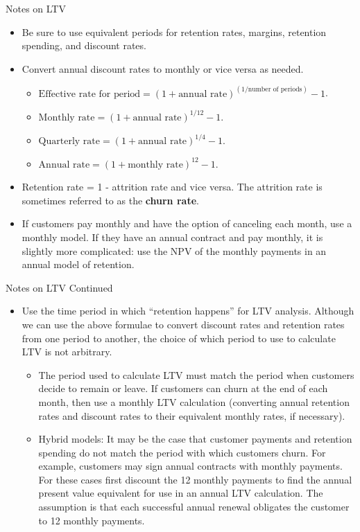 \documentclass[pdf]{beamer}
\newcommand{\empr}[1]{{\color{franklinblue}\textbf{#1}}}
\theoremstyle{remark}
\theoremstyle{definition}
\begin{document}
\begin{frame}[t]{Notes on LTV}
\small
\begin{itemize}
\item Be sure to use equivalent periods for retention rates, margins, retention spending, and discount rates.
\item Convert annual discount rates to monthly or vice versa as needed. 
\begin{itemize}
\item $\text{Effective rate for period} = (1 + \text{annual rate})^{(1 / \text{number of periods})} - 1$.
  \item $\text{Monthly rate} = (1 + \text{annual rate})^{1/12} - 1.$
  \item $\text{Quarterly rate} = (1 + \text{annual rate})^{1/4} - 1.$
  \item $\text{Annual rate} = (1 + \text{monthly rate})^{12} - 1.$
\end{itemize}
\item Retention rate = 1 - attrition rate and vice versa. The attrition rate is sometimes referred to as the \empr{churn rate}.
\item If customers pay monthly and have the option of canceling each month, use a monthly model. If they have an annual contract and pay monthly, it is slightly more complicated: use the NPV of the monthly payments in an annual model of retention.
\end{itemize}
\end{frame}

\begin{frame}[t]{Notes on LTV Continued}
\small
\begin{itemize}
\item Use the time period in which ``retention happens'' for LTV analysis. Although we can use the above formulae to convert discount rates and retention rates from one period to another, the choice of which period to use to calculate LTV is not arbitrary.
\begin{itemize}
  \item The period used to calculate LTV must match the period when customers decide to remain or leave. If customers can churn at the end of each month, then use a monthly LTV calculation (converting annual retention rates and discount rates to their equivalent monthly rates, if necessary).
  \item Hybrid models: It may be the case that customer payments and retention spending do not match the period with which customers churn. For example, customers may sign annual contracts with monthly payments. For these cases first discount the 12 monthly payments to find the annual present value equivalent for use in an annual LTV calculation. The assumption is that each successful annual renewal obligates the customer to 12 monthly payments. 
\end{itemize}
\end{itemize}
\end{frame}
\end{document}
